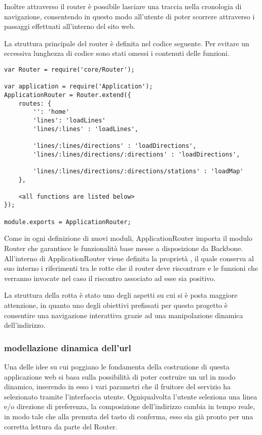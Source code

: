 Inoltre attraverso il router è possibile lasciare una traccia nella cronologia di navigazione, consentendo in questo modo all'utente di poter scorrere attraverso i passaggi effettuati all'interno del sito web.

La struttura principale del router è definita nel codice seguente. Per evitare un eccessiva lunghezza di codice sono stati omessi i contenuti delle funzioni.

\begin{lstlisting}
var Router = require('core/Router');

var application = require('Application');
ApplicationRouter = Router.extend({
    routes: {
        '': 'home'
        'lines': 'loadLines'
        'lines/:lines' : 'loadLines',

        'lines/:lines/directions' : 'loadDirections',
        'lines/:lines/directions/:directions' : 'loadDirections',

        'lines/:lines/directions/:directions/stations' : 'loadMap'
    },

    <all functions are listed below>
});

module.exports = ApplicationRouter;
\end{lstlisting}
\newpage

Come in ogni definizione di nuovi moduli, ApplicationRouter importa il modulo Router che garantisce le funzionalità base messe a disposizione da Backbone. 
All'interno di ApplicationRouter viene definita la proprietà , il quale conserva al suo interno i riferimenti tra le rotte che il router deve riscontrare e le funzioni che verranno invocate nel caso il riscontro associato ad esse sia positivo.

La struttura della rotta è stato uno degli aspetti su cui si è posta maggiore attenzione, in quanto uno degli obiettivi prefissati per questo progetto è consentire una navigazione interattiva grazie ad una manipolazione dinamica dell'indirizzo.

\subsubsection{modellazione dinamica dell'url} %
\label{ssub:modellazione_dinamica_dell_url}


Una delle idee su cui poggiano le fondamenta della costruzione di questa applicazione web si basa sulla possibilità di poter costruire un url in modo dinamico, inserendo in esso i vari parametri che il fruitore del servizio ha selezionato tramite l'interfaccia utente.
Ogniqualvolta l'utente seleziona una linea e/o direzione di preferenza, la composizione dell'indirizzo cambia in tempo reale, in modo tale che alla premuta del tasto di conferma, esso sia già pronto per una corretta lettura da parte del Router.


